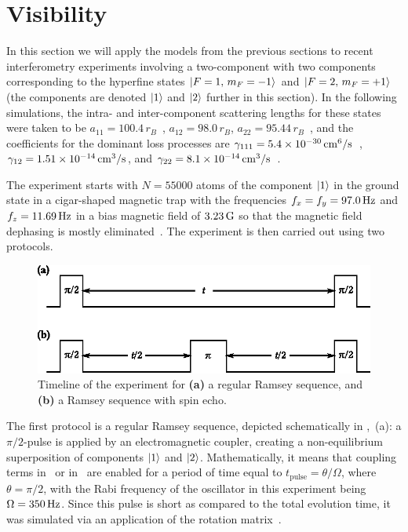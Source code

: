 \section{Visibility}

In this section we will apply the models from the previous sections to recent interferometry experiments involving a two-component \Rb{}  with two components corresponding to the hyperfine states ${\mbox{\ensuremath{\left\vert F=1,\, m_F=-1 \right\rangle}}}$ and ${\mbox{\ensuremath{\left\vert F=2,\, m_F=+1 \right\rangle}}}$~\cite{Egorov2011} (the components are denoted $\mbox{\ensuremath{\left\vert 1 \right\rangle}}$ and $\mbox{\ensuremath{\left\vert 2 \right\rangle}}$ further in this section).
In the following simulations, the intra- and inter-component scattering lengths for these states were taken to be $a_{11} = 100.4\,r_B$~\cite{Widera2006,Mertes2007}, $a_{12} = 98.0\,r_B$, $a_{22} = 95.44\,r_B$~\cite{Egorov2013}, and the coefficients for the dominant loss processes are $\gamma_{111} = 5.4 \times 10^{-30} \mbox{\ensuremath{\,\mathrm{cm^6/s}}}$~\cite{Mertes2007}, $\gamma_{12} = 1.51 \times 10^{-14}\mbox{\ensuremath{\,\mathrm{cm^3/s}}}$, and $\gamma_{22} = 8.1 \times 10^{-14} \mbox{\ensuremath{\,\mathrm{cm^3/s}}}$~\cite{Egorov2013}.

The experiment starts with $N = 55000$ atoms of the component $\mbox{\ensuremath{\left\vert 1 \right\rangle}}$ in the ground state in a cigar-shaped magnetic trap with the frequencies $f_x = f_y = 97.0\mbox{\ensuremath{\,\mathrm{Hz}}}$ and $f_z = 11.69\mbox{\ensuremath{\,\mathrm{Hz}}}$ in a bias magnetic field of $3.23\mbox{\ensuremath{\,\mathrm{G}}}$ so that the magnetic field dephasing is mostly eliminated~\cite{Hall1998}.
The experiment is then carried out using two protocols.

\begin{figure}
    \centerline{\includegraphics{figures_precreated/sequences.eps}}
    \caption[Timeline of Ramsey and spin echo experimental sequences]{
    Timeline of the experiment for \textbf{(a)} a regular Ramsey sequence, and \textbf{(b)} a Ramsey sequence with spin echo.}%
    \label{fig:bec-noise:visibility:sequences}
\end{figure}

The first protocol is a regular Ramsey sequence, depicted schematically in ,~(a): a $\pi/2$-pulse is applied by an electromagnetic coupler, creating a non-equilibrium superposition of components $\mbox{\ensuremath{\left\vert 1 \right\rangle}}$ and $\mbox{\ensuremath{\left\vert 2 \right\rangle}}$.
Mathematically, it means that coupling terms in~ or in~ are enabled for a period of time equal to $t_{\mathrm{pulse}} = \theta / \Omega$, where $\theta = \pi/2$, with the Rabi frequency of the oscillator in this experiment being $\Omega = 350\mbox{\ensuremath{\,\mathrm{Hz}}}$.
Since this pulse is short as compared to the total evolution time, it was simulated via an application of the rotation matrix~.

